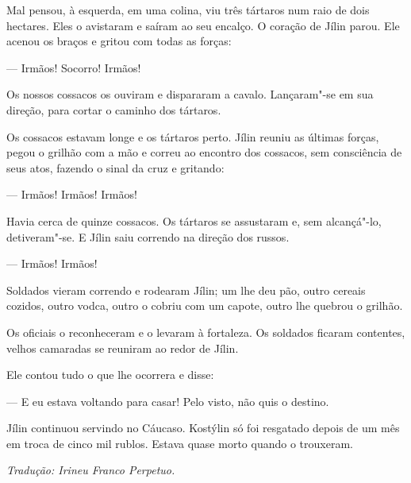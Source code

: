 
Mal pensou, à esquerda, em uma colina, viu três tártaros num raio de
dois hectares. Eles o avistaram e saíram ao seu encalço. O coração de
Jílin parou. Ele acenou os braços e gritou com todas as forças:

--- Irmãos! Socorro! Irmãos!

Os nossos cossacos os ouviram e dispararam a cavalo. Lançaram"-se em sua
direção, para cortar o caminho dos tártaros.

Os cossacos estavam longe e os tártaros perto. Jílin reuniu as últimas
forças, pegou o grilhão com a mão e correu ao encontro dos cossacos, sem
consciência de seus atos, fazendo o sinal da cruz e gritando:

--- Irmãos! Irmãos! Irmãos!

Havia cerca de quinze cossacos. Os tártaros se assustaram e, sem
alcançá"-lo, detiveram"-se. E Jílin saiu correndo na direção dos russos.


--- Irmãos! Irmãos!

Soldados vieram correndo e rodearam Jílin; um lhe deu pão, outro cereais
cozidos, outro vodca, outro o cobriu com um capote, outro lhe quebrou o
grilhão.

Os oficiais o reconheceram e o levaram à fortaleza. Os soldados ficaram
contentes, velhos camaradas se reuniram ao redor de Jílin.

Ele contou tudo o que lhe ocorrera e disse:

--- E eu estava voltando para casar! Pelo visto, não quis o destino.

Jílin continuou servindo no Cáucaso. Kostýlin só foi resgatado depois de
um mês em troca de cinco mil rublos. Estava quase morto quando o
trouxeram.

\medskip

{\footnotesize\hfill\emph{Tradução: Irineu Franco Perpetuo.}}


\chapter*{}
\label{part5}
\thispagestyle{empty}

